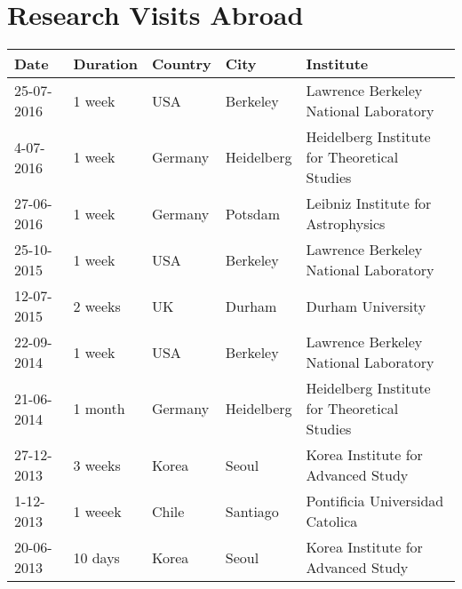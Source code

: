 \documentclass{report}
\begin{document}
\section*{Research Visits Abroad}

\begin{tabular}{p{2.0cm} p{1.5cm} p{1.5cm} p{1.5cm} p{5.5cm}}\hline
Date & Duration & Country & City & Institute\\\hline
25-07-2016 & 1 week & USA & Berkeley & Lawrence Berkeley National Laboratory\\
4-07-2016 & 1 week & Germany & Heidelberg & Heidelberg Institute for Theoretical Studies \\
27-06-2016 & 1 week & Germany & Potsdam & Leibniz Institute for Astrophysics \\
25-10-2015 & 1 week & USA & Berkeley & Lawrence Berkeley National Laboratory\\
12-07-2015 & 2 weeks & UK & Durham & Durham University\\
22-09-2014 & 1 week & USA & Berkeley & Lawrence Berkeley National Laboratory\\ 
21-06-2014 & 1 month & Germany & Heidelberg & Heidelberg Institute for Theoretical Studies \\
27-12-2013 & 3 weeks & Korea & Seoul & Korea Institute for Advanced Study\\
1-12-2013 & 1 weeek & Chile & Santiago & Pontificia Universidad Catolica\\
20-06-2013 & 10 days & Korea & Seoul & Korea Institute for Advanced Study\\\hline
\end{tabular}
\end{document}
